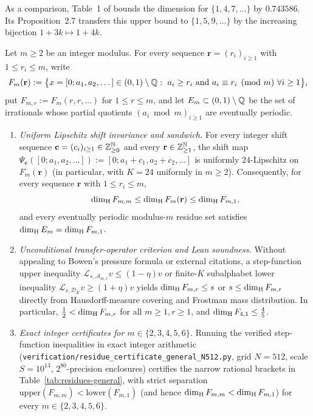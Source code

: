 As a comparison, Table~1 of \cite{CLU} bounds the dimension for
$\{1,4,7,\ldots\}$ by $0.743586$. Its Proposition~2.7 transfers this upper bound
to $\{1,5,9,\ldots\}$ by the increasing bijection $1+3k\mapsto 1+4k$.

\begin{theorem}\label{thm:residues-general}
Let $m\ge2$ be an integer modulus. For every sequence $\mathbf r=(r_i)_{i\ge1}$
with $1\le r_i\le m$, write
\[
F_m(\mathbf r)
:=\bigl\{x=[0;a_1,a_2,\dots]\in(0,1)\setminus\mathbb{Q}:\ a_i\ge r_i\text{ and }a_i\equiv r_i\pmod m\ \forall i\ge1\bigr\},
\]
put $F_{m,r}:=F_m(r,r,\dots)$ for $1\le r\le m$, and let $E_m\subset(0,1)\setminus\mathbb{Q}$
be the set of irrationals whose partial quotients $(a_i\bmod m)_{i\ge1}$ are
eventually periodic.
\begin{enumerate}[label=\textup{(\roman*)},leftmargin=2.2em]
\item \emph{Uniform Lipschitz shift invariance and sandwich.}
For every integer shift sequence $\mathbf c=(c_i)_{i\ge1}\in\mathbb{Z}_{\ge0}^{\mathbb{N}}$ and every
$\mathbf r\in\mathbb{Z}_{\ge1}^{\mathbb{N}}$, the shift map $\Psi_{\mathbf c}([0;a_1,a_2,\dots]):=[0;a_1+c_1,a_2+c_2,\dots]$
is uniformly $24$-Lipschitz on $F_m(\mathbf r)$ (in particular, with $K=24$
uniformly in $m\ge2$). Consequently, for every sequence $\mathbf r$ with
$1\le r_i\le m$,
\[
\dim_{\mathrm{H}} F_{m,m}\le \dim_{\mathrm{H}} F_m(\mathbf r)\le \dim_{\mathrm{H}} F_{m,1},
\]
and every eventually periodic modulus-$m$ residue set satisfies $\dim_{\mathrm{H}} E_m=\dim_{\mathrm{H}} F_{m,1}$.
\item \emph{Unconditional transfer-operator criterion and Lean soundness.}
Without appealing to Bowen's pressure formula or external \cite{CLU} citations,
a step-function upper inequality $\mathcal L_{s,\mathcal A_{m,r}}v\le(1-\eta)v$
or finite-$K$ subalphabet lower inequality $\mathcal L_{s,\mathcal D_K}v\ge(1+\eta)v$
yields $\dim_{\mathrm{H}} F_{m,r}\le s$ or $s\le\dim_{\mathrm{H}} F_{m,r}$ directly from
Hausdorff-measure covering and Frostman mass distribution. In particular,
$\frac12<\dim_{\mathrm{H}} F_{m,r}$ for all $m\ge1,r\ge1$, and $\dim_{\mathrm{H}} F_{4,1}\le\frac45$.
\item \emph{Exact integer certificates for $m\in\{2,3,4,5,6\}$.}
Running the verified step-function inequalities in exact integer arithmetic
(\texttt{verification/\allowbreak residue\_\allowbreak certificate\_\allowbreak general\_\allowbreak N512.py},
grid $N=512$, scale $S=10^{13}$, $2^{80}$-precision enclosures) certifies the
narrow rational brackets in Table~\ref{tab:residues-general}, with strict
separation $\mathrm{upper}(F_{m,m})<\mathrm{lower}(F_{m,1})$ (and hence
$\dim_{\mathrm{H}} F_{m,m}<\dim_{\mathrm{H}} F_{m,1}$) for every $m\in\{2,3,4,5,6\}$.
\end{enumerate}
\end{theorem}

